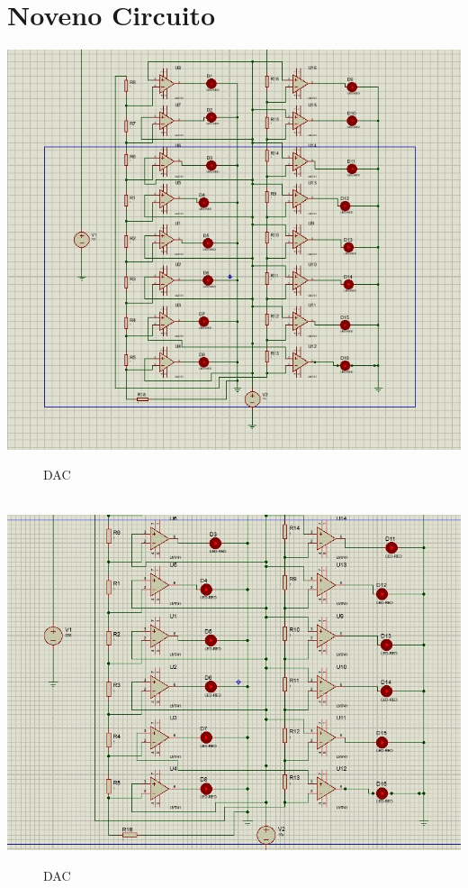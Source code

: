 \documentclass[10pt,a4paper]{article}
\begin{document}
\section{Noveno Circuito}
\begin{center}
 \includegraphics[scale=0.3]{16.png}
 \begin{figure}[hbtp]
 \caption{DAC}
 \centering
 \end{figure}\\
  \includegraphics[scale=0.25]{17.png}
 \begin{figure}[hbtp]
 \caption{DAC}
 \centering
 \end{figure} 
\end{center}
\end{document}
